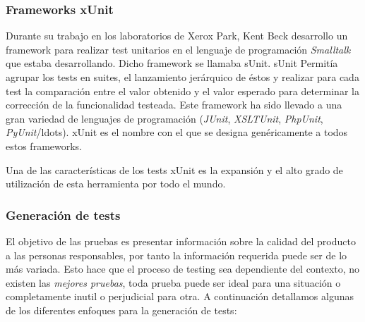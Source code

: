 \subsubsection*{Frameworks xUnit}

Durante su trabajo en los laboratorios de Xerox Park, Kent Beck desarrollo un framework para realizar test unitarios en el lenguaje de programaci\'on {\it Smalltalk} que estaba desarrollando. Dicho framework se llamaba sUnit. sUnit Permit\'ia agrupar los tests en suites, el lanzamiento jer\'arquico de \'estos y realizar para cada test la comparaci\'on entre el valor obtenido y el valor esperado para determinar la correcci\'on de la funcionalidad testeada. Este framework ha sido llevado a una gran variedad de lenguajes de programaci\'on ({\it JUnit}, {\it XSLTUnit}, {\it PhpUnit}, {\it PyUnit}/ldots). xUnit es el nombre con el que se designa gen\'ericamente a todos estos frameworks.

Una de las caracter\'isticas de los tests xUnit es la expansi\'on y el alto grado de utilizaci\'on de esta herramienta por todo el mundo.



\subsubsection*{Generaci\'on de tests}

El objetivo de las pruebas es presentar informaci\'on sobre la calidad del producto a las personas responsables, por tanto la informaci\'on requerida puede ser de lo m\'as variada. Esto hace que el proceso de testing sea dependiente del contexto, no existen las {\it mejores pruebas}, toda prueba puede ser ideal para una situaci\'on o completamente inutil o perjudicial para otra. A continuaci\'on detallamos algunas de los diferentes enfoques para la generaci\'on de tests:

